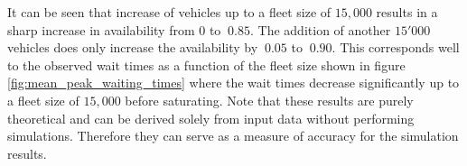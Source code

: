 It can be seen that increase of vehicles up to a fleet size of $15,000$ results
in a sharp increase in availability from $0$ to $~0.85$. The addition of another
$15'000$ vehicles does only increase the availability by $~0.05$ to $~0.90$.
This corresponds well to the observed wait times as a function of the fleet
size shown in figure \ref{fig:mean_peak_waiting_times} where the wait times
decrease significantly up to a fleet size of $15,000$ before saturating.
Note that these results are purely theoretical and can be derived solely
from input data without performing simulations. Therefore they can serve
as a measure of accuracy for the simulation results.
